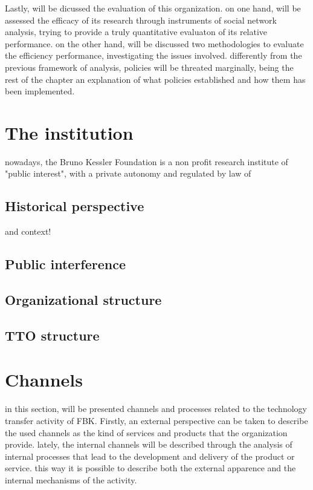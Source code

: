 Lastly, will be dicussed the evaluation of this organization. on one hand, will be assessed the efficacy of its research  through instruments of social network analysis, trying to provide a truly quantitative evaluaton of its relative performance. on the other hand, will be discussed two methodologies to evaluate the efficiency performance, investigating the issues involved. differently from the previous framework of analysis, policies will be threated marginally, being the rest of the chapter an explanation of what policies established and how them has been implemented. 

\section{The institution}

nowadays, the Bruno Kessler Foundation is a non profit research institute of "public interest", with a private autonomy and regulated by law of 

\subsection{Historical perspective}

and context!

\subsection{Public interference}
\subsection{Organizational structure}
\subsection{TTO structure}

\section{Channels}

in this section, will be presented channels and processes related to the technology transfer activity of FBK. Firstly, an external perspective can be taken to describe the used channels as the kind of services and products that the organization provide. lately, the internal channels will be described through the analysis of internal processes that lead to the development and delivery of the product or service. this way it is possible to describe both the external apparence and the internal mechanisms of the activity. 

